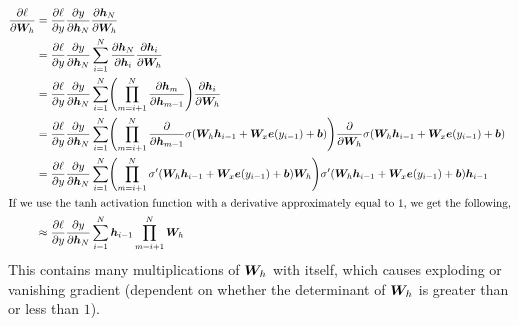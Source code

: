 \begin{align*}
  \pdv{\ell}{\mat{W}_h} &= \pdv{\ell}{y} \pdv{y}{\vec{h}_N} \pdv{\vec{h}_N}{\mat{W}_h} \\
  &= \pdv{\ell}{y} \pdv{y}{\vec{h}_N} \sum_{i=1}^N \pdv{\vec{h}_N}{\vec{h}_i} \pdv{\vec{h}_i}{\mat{W}_h} \\
  &= \pdv{\ell}{y} \pdv{y}{\vec{h}_N} \sum_{i=1}^N \lft( \prod_{m=i+1}^N \pdv{\vec{h}_m}{\vec{h}_{m-1}} \rgt) \pdv{\vec{h}_i}{\mat{W}_h} \\
  &= \pdv{\ell}{y} \pdv{y}{\vec{h}_N} \sum_{i=1}^N \lft( \prod_{m=i+1}^N
  \pdv*{\sigma\lft( \mat{W}_h\vec{h}_{i-1} + \mat{W}_x\vec{e}(y_{i-1}) + \vec{b} \rgt)}{\vec{h}_{m-1}} \rgt)
  \pdv*{\sigma \lft( \mat{W}_h\vec{h}_{i-1} + \mat{W}_x\vec{e}(y_{i-1}) + \vec{b} \rgt)}{\mat{W}_h} \\
  &= \pdv{\ell}{y} \pdv{y}{\vec{h}_N} \sum_{i=1}^N \lft( \prod_{m=i+1}^N \sigma' \lft( \mat{W}_h\vec{h}_{i-1} + \mat{W}_x\vec{e}(y_{i-1}) + \vec{b} \rgt) \mat{W}_h \rgt) \sigma'\lft( \mat{W}_h\vec{h}_{i-1} + \mat{W}_x\vec{e}(y_{i-1}) + \vec{b}\rgt) \vec{h}_{i-1} \\
  \intertext{If we use the $\tanh$ activation function with a derivative
  approximately equal to $1$, we get the following,}
  &\approx \pdv{\ell}{y} \pdv{y}{\vec{h}_N} \sum_{i=1}^N \vec{h}_{i-1} \prod_{m=i+1}^N \mat{W}_h \\
\end{align*}
This contains many multiplications of $\bm{W}_h$ with itself, which causes
exploding or vanishing gradient (dependent on whether the determinant of
$\bm{W}_h$ is greater than or less than $1$).
